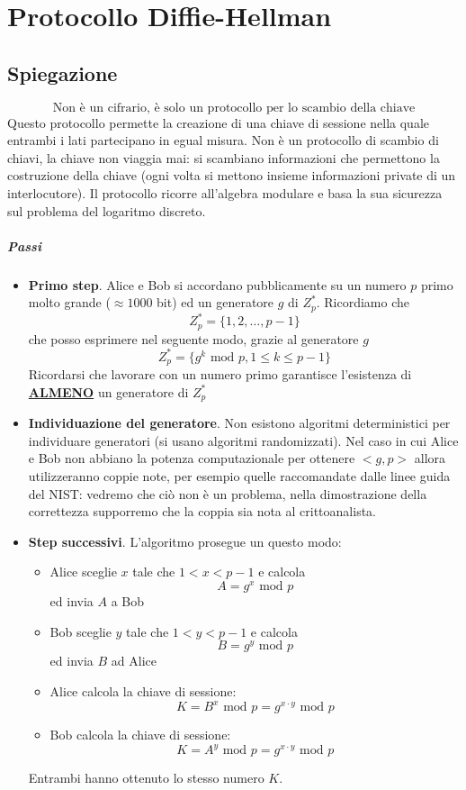 \chapter{Protocollo Diffie-Hellman}
\section{Spiegazione}
\[\boxed{\text{Non è un cifrario, è solo un protocollo per lo scambio della chiave}}\]
Questo protocollo permette la creazione di una chiave di sessione nella quale entrambi i lati partecipano in egual misura. Non è un protocollo di scambio di chiavi, la chiave non viaggia mai: si scambiano informazioni che permettono la costruzione della chiave (ogni volta si mettono insieme informazioni private di un interlocutore). Il protocollo ricorre all'algebra modulare e basa la sua sicurezza sul problema del logaritmo discreto.
\paragraph{Passi} 
\begin{itemize}
	\item \textbf{Primo step}. Alice e Bob si accordano pubblicamente su un numero $p$ primo molto grande ($\approx 1000$ bit) ed un generatore $g$ di $Z_p^*$. Ricordiamo che
	$$Z_p^*=\{1,2, \dots, p-1\}$$
	che posso esprimere nel seguente modo, grazie al generatore $g$
	$$Z_p^*=\{g^k \text{ mod }p, 1 \leq k \leq p-1\}$$
	Ricordarsi che lavorare con un numero primo garantisce l'esistenza di \textbf{\underline{ALMENO}} un generatore di $Z_p^*$
	\item \textbf{Individuazione del generatore}. Non esistono algoritmi deterministici per individuare generatori (si usano algoritmi randomizzati). Nel caso in cui Alice e Bob non abbiano la potenza computazionale per ottenere $<g,p>$ allora utilizzeranno coppie note, per esempio quelle raccomandate dalle linee guida del NIST: vedremo che ciò non è un problema, nella dimostrazione della correttezza supporremo che la coppia sia nota al crittoanalista.
	\item \textbf{Step successivi}. L'algoritmo prosegue un questo modo:
	\begin{itemize}
		\item Alice sceglie $x$ tale che $1 < x < p-1$ e calcola
		$$ A = g^x \text{ mod } p $$
		ed invia $A$ a Bob
		\item Bob sceglie $y$ tale che $1 < y < p-1$ e calcola
		$$ B = g^y \text{ mod } p $$
		ed invia $B$ ad Alice
		\item Alice calcola la chiave di sessione:
		$$ K = B^x \text{ mod } p = \boxed{g^{x \cdot y} \text{ mod } p} $$
		\item Bob calcola la chiave di sessione:
		$$ K = A^y \text{ mod } p = \boxed{g^{x \cdot y} \text{ mod } p} $$
	\end{itemize}
	Entrambi hanno ottenuto lo stesso numero $K$.
	
\end{itemize}

